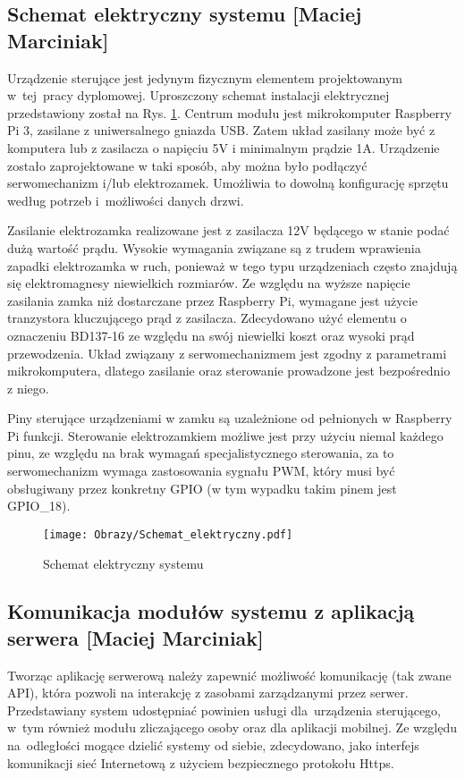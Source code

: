 \documentclass[twoside,10pt]{article}
\begin{document}
\subsection{Schemat elektryczny systemu [Maciej Marciniak]}\label{sec:Schemat elektryczny zamka}
Urządzenie sterujące jest jedynym fizycznym elementem projektowanym w~tej~pracy  dyplomowej. Uproszczony schemat instalacji elektrycznej przedstawiony został na Rys. \ref{schemat:schemat elektryczny systemu}. Centrum modułu jest mikrokomputer \linebreak Raspberry Pi 3, zasilane z uniwersalnego gniazda USB. Zatem układ zasilany może być z komputera lub z zasilacza o napięciu 5V i minimalnym prądzie 1A. Urządzenie zostało zaprojektowane w taki sposób, aby można było podłączyć serwomechanizm i/lub elektrozamek. Umożliwia to dowolną konfigurację sprzętu według potrzeb i~możliwości danych drzwi. 

Zasilanie elektrozamka realizowane jest z zasilacza 12V będącego w stanie podać dużą wartość prądu. Wysokie wymagania związane są z trudem wprawienia zapadki elektrozamka w ruch, ponieważ w tego typu urządzeniach często znajdują się elektromagnesy niewielkich rozmiarów. Ze względu na wyższe napięcie zasilania zamka niż dostarczane przez Raspberry Pi, wymagane jest użycie tranzystora kluczującego prąd z zasilacza. Zdecydowano użyć elementu o oznaczeniu BD137-16 ze względu na swój niewielki koszt oraz wysoki prąd przewodzenia. Układ związany z serwomechanizmem jest zgodny z parametrami mikrokomputera, dlatego zasilanie oraz sterowanie prowadzone jest bezpośrednio z niego.

Piny sterujące urządzeniami w zamku są uzależnione od pełnionych w Raspberry Pi funkcji. Sterowanie elektrozamkiem możliwe jest przy użyciu niemal każdego pinu, ze względu na brak wymagań specjalistycznego sterowania, za to serwomechanizm wymaga zastosowania sygnału PWM, który musi być obsługiwany przez konkretny GPIO (w tym wypadku takim pinem jest GPIO\_18)\cite{RP3}.
\newpage
\begin{figure}[!h]
\centering
\texttt{[image: Obrazy/Schemat\_elektryczny.pdf]}
\caption{Schemat elektryczny systemu}
\label{schemat:schemat elektryczny systemu}
\end{figure}
\newpage

\subsection{Komunikacja modułów systemu z aplikacją  serwera [Maciej Marciniak]}\label{Komunikacja serwer}
Tworząc aplikację serwerową należy zapewnić możliwość komunikację (tak zwane API), która pozwoli na interakcję z zasobami zarządzanymi przez serwer. Przedstawiany system udostępniać powinien usługi dla~urządzenia sterującego, w~tym również modułu zliczającego osoby oraz dla aplikacji mobilnej. Ze względu na~odległości mogące dzielić systemy od siebie, zdecydowano, jako interfejs komunikacji sieć Internetową z użyciem bezpiecznego protokołu Https. 
\end{document}
